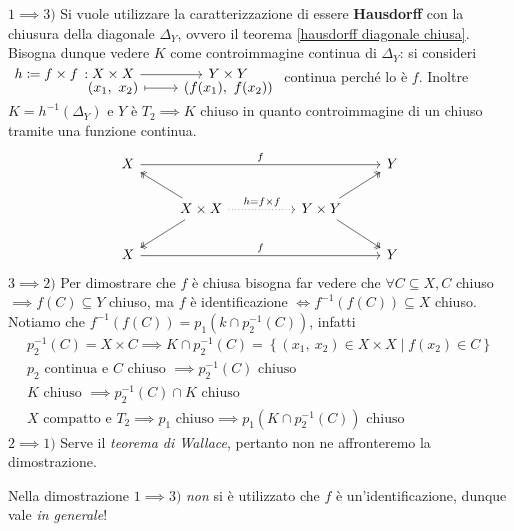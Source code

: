 \begin{demonstration}
	$1 \implies 3)$  Si vuole utilizzare la caratterizzazione di essere \textbf{Hausdorff} con la chiusura della diagonale $\Delta_Y$, ovvero il teorema \ref{hausdorff diagonale chiusa}. Bisogna dunque vedere $K$ come controimmagine continua di $\Delta_Y$: si consideri	 $\funztot {h\coloneqq f\times f} {X\times X} {Y\times Y} {(x_1,\ x_2)} {\left( f(x_1), \ f(x_2) \right) }$ continua perché lo è $f$. Inoltre $K=h^{-1}(\Delta_Y)$ e $Y$ è $T_2 \implies K$ chiuso in quanto controimmagine di un chiuso tramite una funzione continua.
	\[ 	\begin{tikzcd}
				X \arrow[rrrr, "f"] &                                                                          &  &                                                       & Y \\
				& X\times X \arrow[rr, "h=f\times f" ,dotted] \arrow[lu, two heads] \arrow[ld, two heads] &  & Y\times Y \arrow[ru, two heads] \arrow[rd, two heads] &   \\
				X \arrow[rrrr, "f"] &                                                                          &  &                                                       & Y	
			\end{tikzcd} \]	
	$3\implies 2)$ Per dimostrare che $f$ è chiusa bisogna far vedere che $\forall C\subseteq X, C$ chiuso $\implies f(C)\subseteq Y$ chiuso, ma $f$ è identificazione $\iff f^{-1}\left( f(C) \right)\subseteq X$ chiuso. Notiamo che $f^{-1}\left( f(C) \right)= p_1(k\cap p_2^{-1}(C))$, infatti
		\begin{gather*}
			p_2^{-1}(C)=X\times C \implies K\cap p_2^{-1}(C)= \left\{ (x_1,\ x_2)\in X\times X \mid f(x_2)\in C \right\}\\
			p_2 \text{ continua e $C$ chiuso } \implies p_2^{-1}(C) \text{ chiuso} \\
			K \text{ chiuso }\implies p_2^{-1}(C)\cap K \text{ chiuso}\\
			X \text{ compatto e } T_2 \implies p_1 \text{ chiuso}\implies p_1 \left( K\cap p_2^{-1}(C) \right) \text{ chiuso}
		\end{gather*}
	$2\implies 1)$ Serve il \textit{teorema di Wallace}, pertanto non ne affronteremo la dimostrazione.
\end{demonstration}
\begin{observe}
	Nella dimostrazione $1\implies 3)$ \textit{non} si è utilizzato che $f$ è un'identificazione, dunque vale \textit{in generale}!
\end{observe}

